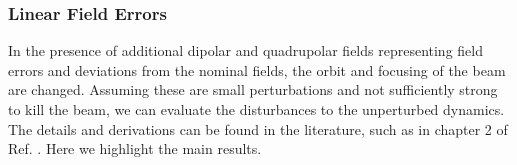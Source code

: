 \subsubsection{Linear Field Errors}

    In the presence of additional dipolar and quadrupolar fields representing field errors and deviations from the nominal fields, the orbit and focusing of the beam are changed. Assuming these are small perturbations and not sufficiently strong to kill the beam, we can evaluate the disturbances to the unperturbed dynamics. The details and derivations can be found in the literature, such as in chapter 2 of Ref. \cite{lee_accelerator_2004}. Here we highlight the main results.

